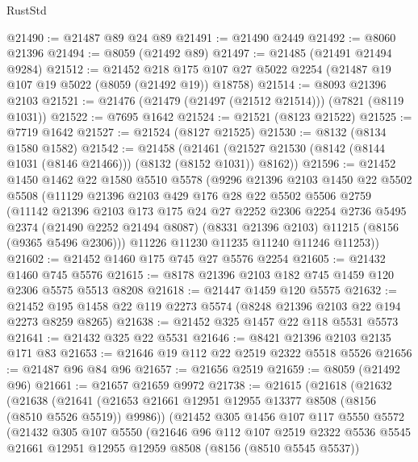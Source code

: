 \begin{lexlean}{RustStd}
\begin{coremodule}
{\begin{coremodule}
{{{{{{{{{{{{{{{{{{{{{{{{{{{{{{{{{{@21490 := @21487 @89 @24 @89
@21491 := @21490 @2449
@21492 := @8060 @21396
@21494 := @8059 (@21492 @89)
@21497 := @21485 (@21491 @21494 @9284)
@21512 := @21452
    @218
    @175
    @107
    @27
    @5022
    @2254
    (@21487 @19 @107 @19 @5022 (@8059 (@21492 @19)) @18758)
@21514 := @8093 @21396 @2103
@21521 := @21476 (@21479 (@21497 (@21512 @21514))) (@7821 (@8119 @1031))
@21522 := @7695 @1642
@21524 := @21521 (@8123 @21522)
@21525 := @7719 @1642
@21527 := @21524 (@8127 @21525)
@21530 := @8132 (@8134 @1580 @1582)
@21542 := @21458
    (@21461 (@21527 @21530 (@8142 (@8144 @1031 (@8146 @21466))) (@8132 (@8152 @1031)) @8162))
@21596 := @21452
    @1450
    @1462
    @22
    @1580
    @5510
    @5578
    (@9296
      @21396
      @2103
      @1450
      @22
      @5502
      @5508
      (@11129
        @21396
        @2103
        @429
        @176
        @28
        @22
        @5502
        @5506
        @2759
        (@11142
          @21396
          @2103
          @173
          @175
          @24
          @27
          @2252
          @2306
          @2254
          @2736
          @5495
          @2374
          (@21490 @2252 @21494 @8087)
          (@8331 @21396 @2103)
          @11215
          (@8156 (@9365 @5496 @2306)))
        @11226
        @11230
        @11235
        @11240
        @11246
        @11253))
@21602 := @21452 @1460 @175 @745 @27 @5576 @2254
@21605 := @21432 @1460 @745 @5576
@21615 := @8178 @21396 @2103 @182 @745 @1459 @120 @2306 @5575 @5513 @8208
@21618 := @21447 @1459 @120 @5575
@21632 := @21452 @195 @1458 @22 @119 @2273 @5574 (@8248 @21396 @2103 @22 @194 @2273 @8259 @8265)
@21638 := @21452 @325 @1457 @22 @118 @5531 @5573
@21641 := @21432 @325 @22 @5531
@21646 := @8421 @21396 @2103 @2135 @171 @83
@21653 := @21646 @19 @112 @22 @2519 @2322 @5518 @5526
@21656 := @21487 @96 @84 @96
@21657 := @21656 @2519
@21659 := @8059 (@21492 @96)
@21661 := @21657 @21659 @9972
@21738 := @21615
    (@21618
      (@21632
        (@21638
          (@21641 (@21653 @21661 @12951 @12955 @13377 @8508 (@8156 (@8510 @5526 @5519)) @9986))
          (@21452
            @305
            @1456
            @107
            @117
            @5550
            @5572
            (@21432
              @305
              @107
              @5550
              (@21646
                @96
                @112
                @107
                @2519
                @2322
                @5536
                @5545
                @21661
                @12951
                @12955
                @12959
                @8508
                (@8156 (@8510 @5545 @5537))
}}}}}}}}}}}}}}}}}}}}}}}}}}}}}}}}}}
\end{coremodule}}
\end{coremodule}
\end{lexlean}
